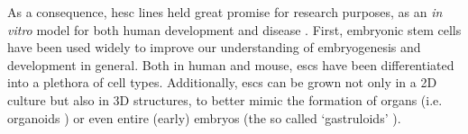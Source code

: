 




As a consequence, \gls{hesc} lines held great promise for research purposes, as an \textit{in vitro} model for both human development and disease \cite{saha2009technical}.
First, embryonic stem cells have been used widely to improve our understanding of embryogenesis and development in general. 
Both in human and mouse, \glspl{esc} have been differentiated into a plethora of cell types.
Additionally, \glspl{esc} can be grown not only in a 2D culture but also in 3D structures, to better mimic the formation of organs (i.e. organoids \cite{clevers2016modeling, lancaster2013cerebral}) or even entire (early) embryos (the so called `gastruloids' \cite{van2020single2}). \\

